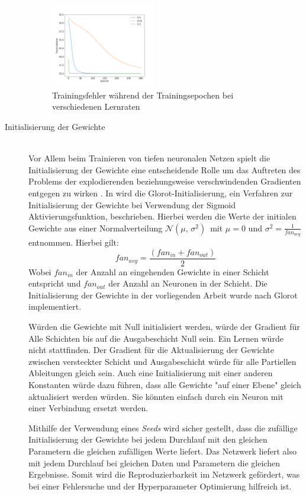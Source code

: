 \begin{description}
	\begin{figure}[h]
		\centering
		\includegraphics[width = 0.45\textwidth]{Bilder/learning_rates.png}
		\caption{Trainingsfehler während der Trainingsepochen bei verschiedenen Lernraten}
		\label{fig:learning_rates}
	\end{figure}
	
	\item[Initialisierung der Gewichte]\hfill \\
	Vor Allem beim Trainieren von tiefen neuronalen Netzen spielt die Initialisierung der Gewichte eine entscheidende Rolle um das Auftreten des Problems der explodierenden beziehungsweise verschwindenden Gradienten entgegen zu wirken \cite{geron2017hands-on}. In \cite{Glorot10understandingthe} wird die Glorot-Initialisierung, ein Verfahren zur Initialisierung der Gewichte bei Verwendung der Sigmoid Aktivierungsfunktion, beschrieben. Hierbei werden die Werte der initialen Gewichte aus einer Normalverteilung $\mathcal{N}(\mu,\,\sigma^{2})\,$ mit $\mu = 0$ und $\sigma^{2}=\frac{1}{fan_{avg}}$ entnommen. Hierbei gilt: 
	\[
	fan_{avg}=\frac{(fan_{in}+fan_{out})}{2}
	\]
	Wobei $fan_{in}$ der Anzahl an eingehenden Gewichte in einer Schicht entspricht und  $fan_{out}$ der Anzahl an Neuronen in der Schicht. Die Initialisierung der Gewichte in der vorliegenden Arbeit wurde  nach Glorot implementiert.

	Würden die Gewichte mit Null initialisiert werden, würde der Gradient für Alle Schichten bis auf die Ausgabeschicht Null sein. Ein Lernen würde nicht stattfinden. Der Gradient für die Aktualisierung der Gewichte zwischen versteckter Schicht und Ausgabeschicht würde für alle Partiellen Ableitungen gleich sein. Auch eine Initialisierung mit einer anderen Konstanten würde dazu führen, dass alle Gewichte "auf einer Ebene" gleich aktualisiert werden würden. Sie könnten einfach durch ein Neuron mit einer Verbindung ersetzt werden.
	
	Mithilfe der Verwendung eines \emph{Seeds} wird sicher gestellt, dass die zufällige Initialisierung der Gewichte bei jedem Durchlauf mit den gleichen Parametern die gleichen zufälligen Werte liefert. Das Netzwerk liefert also mit jedem Durchlauf bei gleichen Daten und Parametern die gleichen Ergebnisse. Somit wird die Reproduzierbarkeit im Netzwerk gefördert, was bei einer Fehlersuche und der Hyperparameter Optimierung hilfreich ist.
	
\end{description}
